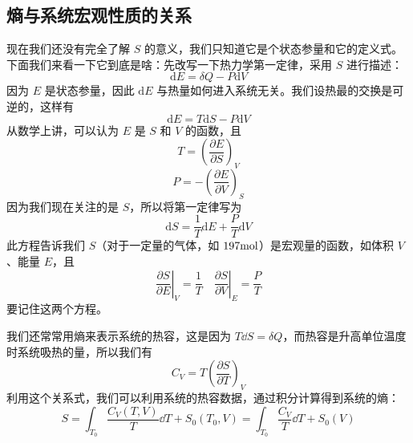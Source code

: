 \subsection{熵与系统宏观性质的关系}
现在我们还没有完全了解 $S$ 的意义，我们只知道它是个状态参量和它的定义式。下面我们来看一下它到底是啥：先改写一下热力学第一定律，采用 $S$ 进行描述：
\begin{equation}
\mathrm d E = \delta{Q} - P\mathrm d V
\end{equation}
因为 $E$ 是状态参量，因此 $\mathrm d E$ 与热量如何进入系统无关。我们设热最的交换是可逆的，这样有
\begin{equation}
\mathrm d E =T\mathrm dS - P\mathrm d V
\end{equation}
从数学上讲，可以认为 $E$ 是 $S $ 和 $V $ 的函数，且
\begin{equation}
T=\left(\frac{\partial E}{\partial S}\right)_V
\end{equation}
\begin{equation}
P=-\left(\frac{\partial E}{\partial V}\right)_S
\end{equation}
因为我们现在关注的是 $S$，所以将第一定律写为
\begin{equation}
\text{d}S=\frac{1}{T}\text{d}E+\frac{P}{T}\text{d}V
\end{equation}
此方程告诉我们 $S$（对于一定量的气体，如 $197 \rm mol$）是宏观量的函数，如体积 $V $、能量 $E$，且
\begin{equation}
\left. \frac{\partial S}{\partial E} \right|_V=\frac{1}{T}\quad \left. \frac{\partial S}{\partial V} \right|_E=\frac{P}{T}
\end{equation}
要记住这两个方程。

我们还常常用熵来表示系统的热容，这是因为 $T\dd S=\delta Q$，而热容是升高单位温度时系统吸热的量，所以我们有
\begin{equation}
C_V=T\left(\frac{\partial S}{\partial T}\right)_V
\end{equation}
利用这个关系式，我们可以利用系统的热容数据，通过积分计算得到系统的熵：
\begin{equation}
S=\int_{T_0} \frac{C_V(T,V)}{T} \dd T+S_0(T_0,V)=
\int_{T_0} \frac{C_V}{T} \dd T+S_0(V)
\end{equation}


 

